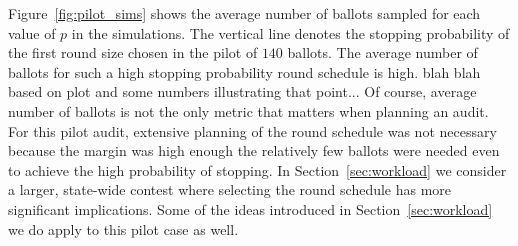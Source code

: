 Figure~\ref{fig:pilot_sims} shows the average number of ballots sampled for each value of $p$ in the simulations. The vertical line denotes the stopping probability of the first round size chosen in the pilot of $140$ ballots. The average number of ballots for such a high stopping probability round schedule is high. blah blah based on plot and some numbers illustrating that point... Of course, average number of ballots is not the only metric that matters when planning an audit. For this pilot audit, extensive planning of the round schedule was not necessary because the margin was high enough the relatively few ballots were needed even to achieve the high probability of stopping. In Section~\ref{sec:workload} we consider a larger, state-wide contest where selecting the round schedule has more significant implications. Some of the ideas introduced in Section~\ref{sec:workload} we do apply to this pilot case as well.


